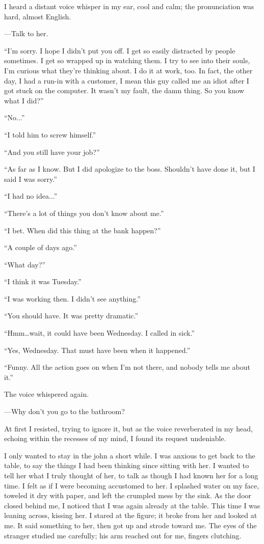 I heard a distant voice whisper in my ear, cool and calm; the
pronunciation was hard, almost English.

---Talk to her.

``I'm sorry. I hope I didn't put you off. I get so easily distracted by
people sometimes. I get so wrapped up in watching them. I try to see
into their souls, I'm curious what they're thinking about. I do it at
work, too. In fact, the other day, I had a run-in with a customer, I
mean this guy called me an idiot after I got stuck on the computer. It
wasn't my fault, the damn thing. So you know what I did?''

``No...''

``I told him to screw himself.''

``And you still have your job?''

``As far as I know. But I did apologize to the boss. Shouldn't have done
it, but I said I was sorry.''

``I had no idea...''

``There's a lot of things you don't know about me.''

``I bet. When did this thing at the bank happen?''

``A couple of days ago.''

``What day?''

``I think it was Tuesday.''

``I was working then. I didn't see anything.''

``You should have. It was pretty dramatic.''

``Hmm\ldots wait, it could have been Wednesday. I called in sick.''

``Yes, Wednesday. That must have been when it happened.''

``Funny. All the action goes on when I'm not there, and nobody tells me
about it.''

The voice whispered again.

---Why don't you go to the bathroom?

At first I resisted, trying to ignore it, but as the voice reverberated
in my head, echoing within the recesses of my mind, I found its request
undeniable.

I only wanted to stay in the john a short while. I was anxious to get
back to the table, to say the things I had been thinking since sitting
with her. I wanted to tell her what I truly thought of her, to talk as
though I had known her for a long time. I felt as if I were becoming
accustomed to her. I splashed water on my face, toweled it dry with
paper, and left the crumpled mess by the sink. As the door closed behind
me, I noticed that I was again already at the table. This time I was
leaning across, kissing her. I stared at the figure; it broke from her
and looked at me. It said something to her, then got up and strode
toward me. The eyes of the stranger studied me carefully; his arm
reached out for me, fingers clutching.

